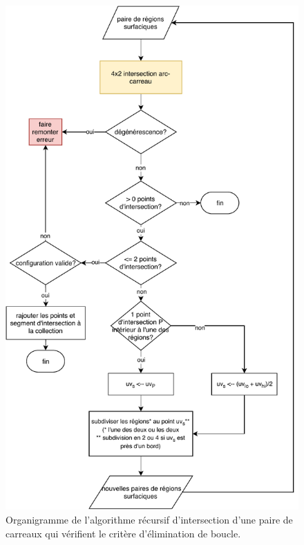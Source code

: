 \begin{figure}
	\centering
	\includegraphics[scale=0.9]{algorithmes/mindmap-intersect_simple_surfaces.pdf}
	\caption{Organigramme de l'algorithme récursif d'intersection d'une paire de carreaux qui vérifient le critère d'élimination de boucle.}
	\label{flowchart:intersect_simple_surfaces}
\end{figure}

